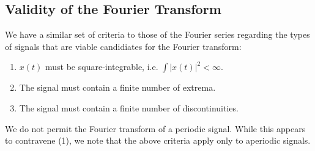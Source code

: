 \subsection{Validity of the Fourier Transform}
%
We have a similar set of criteria to those of the Fourier series regarding
the types of signals that are viable candidiates for the Fourier transform:
%
\begin{enumerate}
\item $x(t)$ must be square-integrable, i.e. $\int|x(t)|^2 < \infty$.
\item The signal must contain a finite number of extrema.
\item The signal must contain a finite number of discontinuities.
\end{enumerate}
%
We do not permit the Fourier transform of a periodic signal. While this appears
to contravene (1), we note that the above criteria apply only to aperiodic signals.

